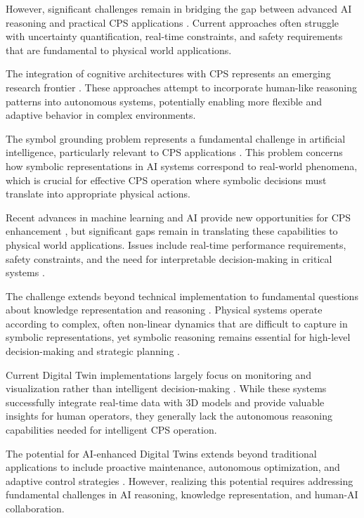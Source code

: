 However, significant challenges remain in bridging the gap between advanced AI reasoning and practical CPS applications \cite{hendrycks2019natural, koh2021wilds}. Current approaches often struggle with uncertainty quantification, real-time constraints, and safety requirements that are fundamental to physical world applications.

The integration of cognitive architectures with CPS represents an emerging research frontier \cite{chen2020cognitive, zhang2021cognitive}. These approaches attempt to incorporate human-like reasoning patterns into autonomous systems, potentially enabling more flexible and adaptive behavior in complex environments.

The symbol grounding problem represents a fundamental challenge in artificial intelligence, particularly relevant to CPS applications \cite{harnad1990symbol, barsalou2008grounded}. This problem concerns how symbolic representations in AI systems correspond to real-world phenomena, which is crucial for effective CPS operation where symbolic decisions must translate into appropriate physical actions.

Recent advances in machine learning and AI provide new opportunities for CPS enhancement \cite{lake2017building, marcus2020next}, but significant gaps remain in translating these capabilities to physical world applications. Issues include real-time performance requirements, safety constraints, and the need for interpretable decision-making in critical systems \cite{smith1987situated, suchman1987plans}.

The challenge extends beyond technical implementation to fundamental questions about knowledge representation and reasoning \cite{hayes1985naive, davis1990representation}. Physical systems operate according to complex, often non-linear dynamics that are difficult to capture in symbolic representations, yet symbolic reasoning remains essential for high-level decision-making and strategic planning \cite{lake2018generalization, fodor1988connectionism}.

Current Digital Twin implementations largely focus on monitoring and visualization rather than intelligent decision-making \cite{grieves2014digital, tao2019digital, ISO23247, jones2020characterising}. While these systems successfully integrate real-time data with 3D models and provide valuable insights for human operators, they generally lack the autonomous reasoning capabilities needed for intelligent CPS operation.

The potential for AI-enhanced Digital Twins extends beyond traditional applications to include proactive maintenance, autonomous optimization, and adaptive control strategies \cite{boje2020towards, lu2020digital}. However, realizing this potential requires addressing fundamental challenges in AI reasoning, knowledge representation, and human-AI collaboration.

